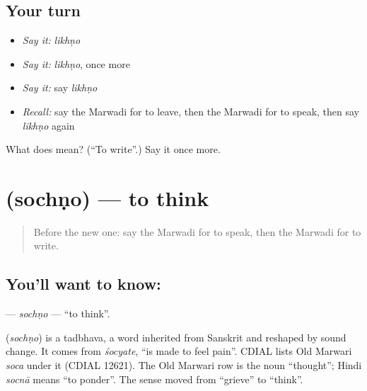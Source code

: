 \subsection*{Your turn}
\begin{itemize}
\raggedright
  \item \emph{Say it:} \emph{likhṇo}
  \item \emph{Say it:} \emph{likhṇo}, once more
  \item \emph{Say it:} say \emph{likhṇo}
  \item \emph{Recall:} say the Marwadi for to leave, then the Marwadi for to speak, then say \emph{likhṇo} again
\end{itemize}

\begin{tcolorbox}[breakable,colback=teal!4,colframe=teal!35!black,title={Before you move on}]
What does  mean? (\textquotedblleft{}To write\textquotedblright{}.) Say it once more.
\end{tcolorbox}
\section[\texorpdfstring{\mw{सोचणो} (sochṇo)}{सोचणो (sochṇo)}]{ (sochṇo) — to think}

\label{lesson:MW-C57-sochno}



\begin{quote}
Before the new one: say the Marwadi for to speak, then the Marwadi for to write.
\end{quote}

\subsection*{You'll want to know: }
\textbf{} — \emph{sochṇo} — \textquotedblleft{}to think\textquotedblright{}.

\begin{cousinweb}
\textbf{} (\emph{sochṇo}) is a tadbhava, a word inherited from Sanskrit and reshaped by sound change. It comes from \emph{śocyate}, \textquotedblleft{}is made to feel pain\textquotedblright{}. CDIAL lists Old Marwari \emph{soca} under it (CDIAL 12621). The Old Marwari row is the noun \textquotedblleft{}thought\textquotedblright{}; Hindi \emph{socnā} means \textquotedblleft{}to ponder\textquotedblright{}. The sense moved from \textquotedblleft{}grieve\textquotedblright{} to \textquotedblleft{}think\textquotedblright{}.
\end{cousinweb}

